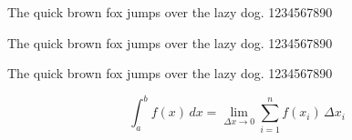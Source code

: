\documentclass{article}
\newcommand{\pangram}[1]{{#1 The quick brown fox jumps over
  the lazy dog. 1234567890\par}}
\begin{document}
\large
\pangram{\rmfamily}
\pangram{\sffamily}
\pangram{\ttfamily}
\[
  \int_a^b \! f(x) \, dx = \lim_{\Delta x \rightarrow 0}
  \sum_{i=1}^{n} f(x_i) \,\Delta x_i
\]
\end{document}
